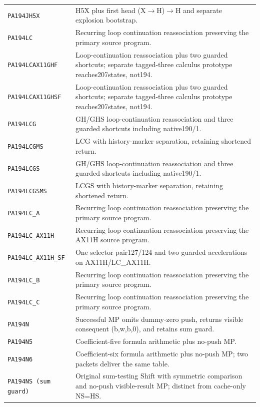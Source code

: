 \begin{longtable}{@{}p{.29\linewidth}p{.65\linewidth}@{}}
\texttt{PA194JH5X} & H5X plus first head (X$\to$H)$\to$H and separate explosion bootstrap.\\[3pt]
\texttt{PA194LC} & Recurring loop continuation reassociation preserving the primary source program.\\[3pt]
\texttt{PA194LCAX11GHF} & Loop-continuation reassociation plus two guarded shortcuts; separate tagged-three calculus prototype reaches207states, not194.\\[3pt]
\texttt{PA194LCAX11GHSF} & Loop-continuation reassociation plus two guarded shortcuts; separate tagged-three calculus prototype reaches207states, not194.\\[3pt]
\texttt{PA194LCG} & GH/GHS loop-continuation reassociation and three guarded shortcuts including native190/1.\\[3pt]
\texttt{PA194LCGMS} & LCG with history-marker separation, retaining shortened return.\\[3pt]
\texttt{PA194LCGS} & GH/GHS loop-continuation reassociation and three guarded shortcuts including native190/1.\\[3pt]
\texttt{PA194LCGSMS} & LCGS with history-marker separation, retaining shortened return.\\[3pt]
\texttt{PA194LC\_\allowbreak A} & Recurring loop continuation reassociation preserving the primary source program.\\[3pt]
\texttt{PA194LC\_\allowbreak AX11H} & Recurring loop continuation reassociation preserving the AX11H source program.\\[3pt]
\texttt{PA194LC\_\allowbreak AX11H\_\allowbreak SF} & One selector pair127/124 and two guarded accelerations on AX11H/LC\_AX11H.\\[3pt]
\texttt{PA194LC\_\allowbreak B} & Recurring loop continuation reassociation preserving the primary source program.\\[3pt]
\texttt{PA194LC\_\allowbreak C} & Recurring loop continuation reassociation preserving the primary source program.\\[3pt]
\texttt{PA194N} & Successful MP omits dummy-zero push, returns visible consequent (b,w,b,0), and retains sum guard.\\[3pt]
\texttt{PA194N5} & Coefficient-five formula arithmetic plus no-push MP.\\[3pt]
\texttt{PA194N6} & Coefficient-six formula arithmetic plus no-push MP; two packets deliver the same table.\\[3pt]
\texttt{PA194NS (sum guard)} & Original sum-testing Shift with symmetric comparison and no-push visible-result MP; distinct from cache-only NS=HS.\\[3pt]

\end{longtable}
